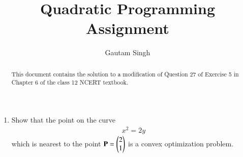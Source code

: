 \documentclass[journal,12pt,twocolumn]{IEEEtran}
\renewcommand{\vec}[1]{\boldsymbol{\mathbf{#1}}}
\begin{document}
\vspace{3cm}
\title{Quadratic Programming Assignment}
\author{Gautam Singh}
\maketitle
\bigskip

\begin{abstract}
    This document contains the solution to a modification of Question 27 of 
    Exercise 5 in Chapter 6 of the class 12 NCERT textbook.
\end{abstract}

\begin{enumerate}
    \item Show that the point on the curve 
    \begin{align}
        x^2 = 2y
        \label{eq:curve}
    \end{align}
    which is nearest to the point $\vec{P} = \myvec{2\\1}$ is a convex
    optimization problem.


\end{enumerate}
\end{document}
